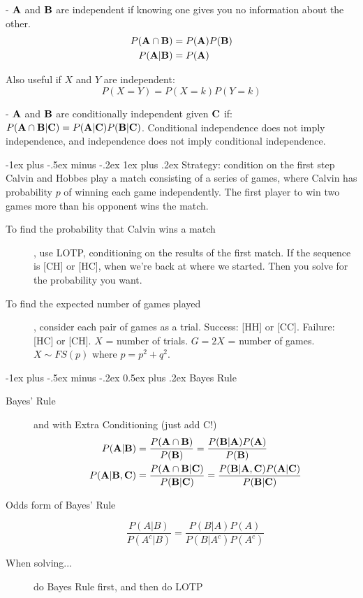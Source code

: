 \documentclass[10pt,landscape]{article}
\makeatletter
\theoremstyle{definition}
\renewcommand{\section}{\@startsection{section}{1}{0mm}%
                                {-1ex plus -.5ex minus -.2ex}%
                                {0.5ex plus .2ex}%
                                {\normalfont\large\bfseries}}
\renewcommand{\subsubsection}{\@startsection{subsubsection}{3}{0mm}%
                                {-1ex plus -.5ex minus -.2ex}%
                                {1ex plus .2ex}%
                                {\normalfont\small\bfseries}}
\makeatother
\begin{document}
\begin{multicols}{3}
\begin{description}
        \item[Independent Events] - ${\bf A}$ and ${\bf B}$ are independent if knowing one gives you no information about the other.
           \begin{align*} 
            P({\bf A}\cap {\bf B}) &= P({\bf A})P({\bf B}) \\
            P({\bf A}|{\bf B}) &= P({\bf A})
           \end{align*}
        \item Also useful if $X$ and $Y$ are independent:
        \[P(X=Y)=P(X=k)P(Y=k)\]
        \item[Conditional Independence] - ${\bf A}$ and ${\bf B}$ are conditionally independent given ${\bf C}$ if: $P({\bf A}\cap {\bf B}|{\bf C}) = P({\bf A}|{\bf C})P({\bf B}|{\bf C})$. Conditional independence does not imply independence, and independence does not imply conditional independence.
    \end{description}

\subsubsection{Strategy: condition on the first step}
Calvin and Hobbes play a match consisting of a series of games, where Calvin has probability $p$ of winning each game independently. The first player to win two games more than his opponent wins the match. 

\begin{description}
\item[To find the probability that Calvin wins a match], use LOTP, conditioning on the results of the first match. If the sequence is [CH] or [HC], when we're back at where we started. Then you solve for the probability you want. 
\item[To find the expected number of games played], consider each pair of games as a trial. Success: [HH] or [CC]. Failure: [HC] or [CH]. $X$ = number of trials. $G = 2X$ = number of games. $X \sim FS(p)$ where $p=p^2+q^2$.
\end{description}
\section{Bayes Rule}

\begin{description}
\item[Bayes' Rule] and with Extra Conditioning (just add C!)
    \begin{align*}
         P({\bf A}|{\bf B}) &= \frac{P({\bf A} \cap {\bf B})}{P({\bf B})} = \frac{P({\bf B}|{\bf A})P({\bf A})}{P({\bf B})} \\
         P({\bf A}|{\bf B}, {\bf C}) &= \frac{P({\bf A} \cap {\bf B} | {\bf C})}{P({\bf B} | {\bf C})} = \frac{P({\bf B}|{\bf A}, {\bf C})P({\bf A} | {\bf C})}{P({\bf B} | {\bf C})} 
    \end{align*}
\item[Odds form of Bayes' Rule]
\[\frac{P(A|B)}{P(A^c|B)}=\frac{P(B|A)P(A)}{P(B|A^c)P(A^c)}\]
    \item[When solving...] do Bayes Rule first, and then do LOTP
\end{description}


\end{multicols}
\end{document}
